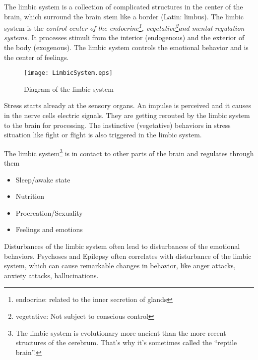 \documentclass[../main.tex]{subfiles}
\begin{document}
        
        The limbic system  is a collection of complicated structures in the center of the brain, which surround the brain stem like a border (Latin: limbus).
        The limbic system is the \emph{control center of the endocrine\footnote{endocrine: related to the inner secretion of glands}, vegetative\footnote{vegetative: Not subject to conscious control}and mental regulation systems.}
        It processes stimuli from the interior (endogenous) and the exterior of the body (exogenous).
        The limbic system controls the emotional behavior and is the center of feelings.
        

        \begin{figure}[htp]
        \centering
         \texttt{[image: LimbicSystem.eps]}
          \caption{Diagram of the limbic system~\cite{BlausenLimbic}}
        \end{figure}

        Stress starts already at the sensory organs. An impulse is perceived and it causes in the nerve cells electric signals. They are getting rerouted by the limbic system to the brain for processing.
        The instinctive (vegetative) behaviors in stress situation like fight or flight is also triggered in the limbic system.

        \newpage
        The limbic system\footnote{The limbic system is evolutionary more ancient than the more recent structures of the cerebrum. That's why it's sometimes called the ``reptile brain''.} is in contact to other parts of the brain and regulates through them
        \begin{itemize}
        \item Sleep/awake state
        \item Nutrition
        \item Procreation/Sexuality
          \item Feelings and emotions          
        \end{itemize}

        Disturbances of the limbic system often lead to disturbances of the emotional behaviors. Psychoses and Epilepsy often correlates with disturbance of the limbic system, which can cause  remarkable changes in behavior, like anger attacks, anxiety attacks, hallucinations.
\end{document}
